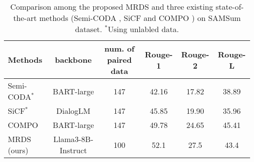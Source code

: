 \begin{table*}[htbp]
\caption{Comparison among the proposed MRDS and three existing state-of-the-art methods (Semi-CODA \cite{chen2021simple}, SiCF \cite{he-etal-2024-semi} and COMPO \cite{ouyang2023compositional}) on SAMSum dataset. $^*$Using unlabled data.}
\label{tab:compare_sota}
\begin{tabular}{lccccc}
\toprule
Methods     & backbone       & num. of paired data & Rouge-1 & Rouge-2 & Rouge-L \\ \hline
Semi-CODA$^*$   & BART-large               & 147                 & 42.16   & 17.82   & 38.89   \\
SiCF$^*$      & DialogLM                & 147                 & 45.85   & 19.90   & 35.96   \\
COMPO       & BART-large               & 147                 & 49.78   & 24.65   & 45.41   \\
MRDS (ours) & Llama3-8B-Instruct       & 100                 & 52.1    & 27.5    & 43.4    \\ 
\bottomrule
\end{tabular}
\end{table*}